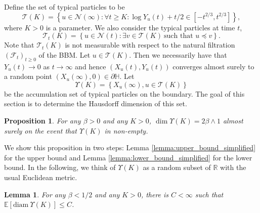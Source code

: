 \documentclass{article}
\newtheorem{lem}[thm]{Lemma}
\newtheorem{prop}[thm]{Proposition}
\theoremstyle{definition}
\numberwithin{equation}{section}
\numberwithin{thm}{section}
\newcommand*{\RR}{\ensuremath{\mathbb{R}}}	        	%
\newcommand*{\EE}{\ensuremath{\mathbb{E}}}	        	%
\newcommand*{\HH}{\ensuremath{\mathbb{H}}}	        	%
\newcommand*{\diam}{\ensuremath{\mathrm{diam} \ }}	        %
\begin{document}
Define the set of typical particles {to be}
\begin{equation}\label{eq:def:typical_particles}
    \mathcal{T}(K) = \left\{ u\in \mathcal{N}(\infty): \forall t\geq K: \log Y_u(t) +t/2 \in [-t^{2/3}, t^{2/3}]\right\},
\end{equation}
where $K>0$ is a parameter. We also consider the typical particles at time $t$,
\begin{equation*}
    \mathcal{T}_t(K) = \left\{u\in \mathcal{N}(t):\exists v \in \mathcal{T}(K) \ \text{such that } u \preceq v\right\}.
\end{equation*}
Note that $\mathcal{T}_t(K)$ is not measurable {with respect to} the natural filtration $(\mathcal{F}_t)_{t\geq 0}$ of the BBM. Let $u\in \mathcal{T}(K)$. Then we necessarily have that $Y_u(t) \to 0$ as $t \to \infty$ and hence $(X_u(t),Y_u(t))$ converges almost surely to a random point $(X_u(\infty), 0) \in \partial \HH$. Let
\begin{equation}\label{eq:def:typical_acc}
    \Upsilon(K)= \left\{ X_u(\infty), u\in \mathcal{T}(K) \right\}
\end{equation}
{be} the accumulation set of typical particles on the boundary. The goal of this section is to determine the Hausdorff dimension of this set. 

\begin{prop}\label{prop:dim_typical}
    For any $\beta>0$ and any $K>0$, $\dim \Upsilon(K) =2\beta \wedge 1$ almost surely on the event that $\Upsilon(K)$ in non-empty. 
\end{prop}

We show this proposition in two steps{:} Lemma \ref{lemma:upper_bound_simplified} for the upper bound and Lemma \ref{lemma:lower_bound_simplified} for the lower bound. In the following, we think of $\Upsilon(K)$ as a random subset of $\RR$ with the usual Euclidean metric.

\begin{lem}\label{lemma:diameter}
    For any $\beta<1/2$ and any $K>0$, there is $C<\infty$ such that $\EE[\diam \Upsilon (K)]\leq C$. 
\end{lem}
\end{document}
